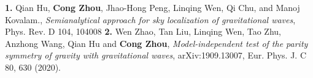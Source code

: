 
\begin{cventries}
\vspace{-0.45cm}
  \cventry
    {}
    {}
    {}
    {}
    {\textbf{1.} \textnormal{Qian Hu, \textbf{Cong Zhou}, Jhao-Hong Peng, Linqing Wen, Qi Chu, and Manoj Kovalam., \textsl{Semianalytical approach for sky localization of gravitational waves}, Phys. Rev. D 104, 104008}}
  \vspace{-0.2cm}
  \cventry
  {}
  {}
  {}
  {}
  {\textbf{2.} \textnormal{Wen Zhao, Tan Liu, Linqing Wen, Tao Zhu, Anzhong Wang, Qian Hu and \textbf{Cong Zhou},  \textsl{Model-independent test of the parity symmetry of gravity with gravitational waves}, \textnormal{arXiv:1909.13007,} Eur. Phys. J. C 80, 630 (2020).}}
\vspace{-0.35cm}
\end{cventries}